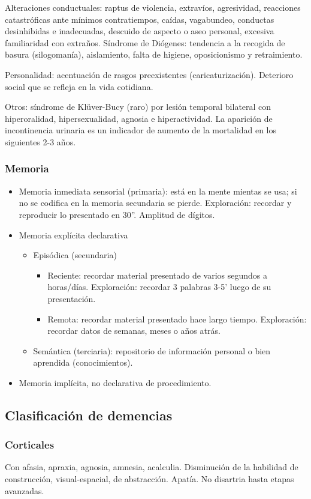 Alteraciones conductuales: raptus de violencia, extravíos, agresividad, reacciones catastróficas ante mínimos contratiempos, caídas, vagabundeo, conductas desinhibidas e inadecuadas, descuido de aspecto o aseo personal, excesiva familiaridad con extraños. Síndrome de Diógenes: tendencia a la recogida de basura (silogomanía), aislamiento, falta de higiene, oposicionismo y retraimiento.

Personalidad: acentuación de rasgos preexistentes (caricaturización). Deterioro social que se refleja en la vida cotidiana.

Otros: síndrome de Klüver-Bucy (raro) por lesión temporal bilateral con hiperoralidad, hipersexualidad, agnosia e hiperactividad. La aparición de incontinencia urinaria es un indicador de aumento de la mortalidad en los siguientes 2-3 años.
\subsubsection*{Memoria}
\begin{itemize}
	\item Memoria inmediata sensorial (primaria): está en la mente mientas se usa; si no se codifica en la memoria secundaria se pierde. Exploración: recordar y reproducir lo presentado en 30”. Amplitud de dígitos.
	\item Memoria explícita declarativa
	\begin{itemize}
		\item Episódica (secundaria)
		\begin{itemize}
			\item Reciente: recordar material presentado de varios segundos a horas/días. Exploración: recordar 3 palabras 3-5’ luego de su presentación.
			\item Remota: recordar material presentado hace largo tiempo. Exploración: recordar datos de semanas, meses o años atrás.
		\end{itemize}
		\item Semántica (terciaria): repositorio de información personal o bien aprendida (conocimientos).
	\end{itemize}
	\item Memoria implícita, no declarativa de procedimiento.
\end{itemize}
\subsection*{Clasificación de demencias}
\subsubsection*{Corticales}
Con afasia, apraxia, agnosia, amnesia, acalculia. Disminución de la habilidad de construcción, visual-espacial, de abstracción. Apatía. No disartria hasta etapas avanzadas.

